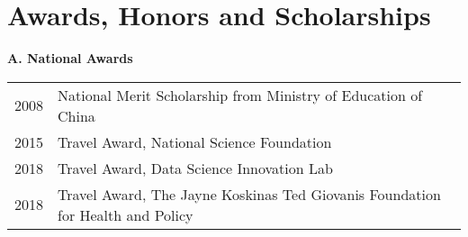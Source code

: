 \documentclass[10pt]{article}
\begin{document}
\begin{enumerate}
\end{enumerate}
%
%



\section*{Awards, Honors and Scholarships}

\textbf{A. National Awards}

\begin{table}[H]
\hskip0.9cm\begin{tabular}{p{1.6cm}p{12cm}}
2008 & National Merit Scholarship from Ministry of Education of China  \\
2015 & Travel Award, National Science Foundation \\
2018 & Travel Award, Data Science Innovation Lab \\
2018 & Travel Award, The Jayne Koskinas Ted Giovanis Foundation for Health and Policy
\end{tabular}
\end{table}
\end{document}
